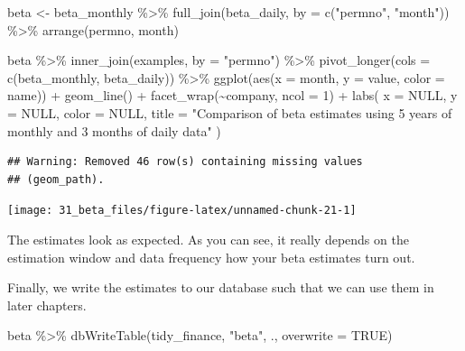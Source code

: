 \documentclass[
]{krantz}
\newenvironment{Shaded}{\begin{snugshade}}{\end{snugshade}}
\newcommand{\AttributeTok}[1]{\textcolor[rgb]{0.61,0.61,0.61}{#1}}
\newcommand{\ConstantTok}[1]{\textcolor[rgb]{0,0,0}{#1}}
\newcommand{\DecValTok}[1]{\textcolor[rgb]{0.06,0.06,0.06}{#1}}
\newcommand{\FunctionTok}[1]{\textcolor[rgb]{0,0,0}{#1}}
\newcommand{\NormalTok}[1]{#1}
\newcommand{\OtherTok}[1]{\textcolor[rgb]{0.37,0.37,0.37}{#1}}
\newcommand{\SpecialCharTok}[1]{\textcolor[rgb]{0,0,0}{#1}}
\newcommand{\StringTok}[1]{\textcolor[rgb]{0.5,0.5,0.5}{#1}}
\begin{document}
\begin{Shaded}
\begin{Highlighting}[]
\NormalTok{beta }\OtherTok{\textless{}{-}}\NormalTok{ beta\_monthly }\SpecialCharTok{\%\textgreater{}\%}
  \FunctionTok{full\_join}\NormalTok{(beta\_daily, }\AttributeTok{by =} \FunctionTok{c}\NormalTok{(}\StringTok{"permno"}\NormalTok{, }\StringTok{"month"}\NormalTok{)) }\SpecialCharTok{\%\textgreater{}\%}
  \FunctionTok{arrange}\NormalTok{(permno, month)}

\NormalTok{beta }\SpecialCharTok{\%\textgreater{}\%}
  \FunctionTok{inner\_join}\NormalTok{(examples, }\AttributeTok{by =} \StringTok{"permno"}\NormalTok{) }\SpecialCharTok{\%\textgreater{}\%}
  \FunctionTok{pivot\_longer}\NormalTok{(}\AttributeTok{cols =} \FunctionTok{c}\NormalTok{(beta\_monthly, beta\_daily)) }\SpecialCharTok{\%\textgreater{}\%}
  \FunctionTok{ggplot}\NormalTok{(}\FunctionTok{aes}\NormalTok{(}\AttributeTok{x =}\NormalTok{ month, }\AttributeTok{y =}\NormalTok{ value, }\AttributeTok{color =}\NormalTok{ name)) }\SpecialCharTok{+}
  \FunctionTok{geom\_line}\NormalTok{() }\SpecialCharTok{+}
  \FunctionTok{facet\_wrap}\NormalTok{(}\SpecialCharTok{\textasciitilde{}}\NormalTok{company, }\AttributeTok{ncol =} \DecValTok{1}\NormalTok{) }\SpecialCharTok{+}
  \FunctionTok{labs}\NormalTok{(}
    \AttributeTok{x =} \ConstantTok{NULL}\NormalTok{, }\AttributeTok{y =} \ConstantTok{NULL}\NormalTok{, }\AttributeTok{color =} \ConstantTok{NULL}\NormalTok{,}
    \AttributeTok{title =} \StringTok{"Comparison of beta estimates using 5 years of monthly and 3 months of daily data"}
\NormalTok{  )}
\end{Highlighting}
\end{Shaded}

\begin{verbatim}
## Warning: Removed 46 row(s) containing missing values
## (geom_path).
\end{verbatim}

\begin{center}\texttt{[image: 31\_beta\_files/figure-latex/unnamed-chunk-21-1]} \end{center}

The estimates look as expected. As you can see, it really depends on the estimation window and data frequency how your beta estimates turn out.

Finally, we write the estimates to our database such that we can use them in later chapters.

\begin{Shaded}
\begin{Highlighting}[]
\NormalTok{beta }\SpecialCharTok{\%\textgreater{}\%}
  \FunctionTok{dbWriteTable}\NormalTok{(tidy\_finance, }\StringTok{"beta"}\NormalTok{, ., }\AttributeTok{overwrite =} \ConstantTok{TRUE}\NormalTok{)}
\end{Highlighting}
\end{Shaded}
\end{document}
